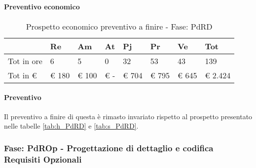 			\paragraph{Preventivo economico}
										\begin{table}[H] \begin{center} \begin{tabular}{llllllll}
										\toprule
											&	\textbf{Re}	&	\textbf{Am}	&	\textbf{At}	&	\textbf{Pj}	&	\textbf{Pr}	&	\textbf{Ve}	&	\textbf{Tot}	 \\

										\midrule
										Tot in ore	&	6	&	5	&	0	&	32	&	53	&	43	&	139	 \\


										Tot in €	&	 €     180 	 & 	 €      100 	 & 	 €         -   	 & 	 €     704 	 & 	 €    795 	 & 	 €     645 	 & 	 €     2.424 	 \\
										\bottomrule
										\end{tabular} \end{center} \caption{Prospetto economico preventivo a finire - Fase:
										PdRD
										} \end{table}

			\paragraph{Preventivo} Il preventivo a finire di questa  è rimasto invariato rispetto al prospetto presentato nelle tabelle \ref{tab:h_PdRD} e \ref{tab:s_PdRD}.
		\newpage
		\subsubsection {Fase: PdROp - Progettazione di dettaglio e codifica Requisiti Opzionali}
